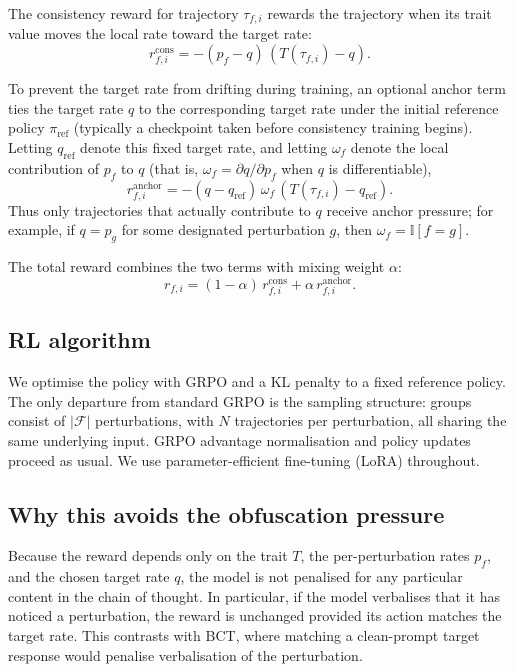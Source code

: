 \documentclass{article}
\begin{document}
The consistency reward for trajectory $\tau_{f,i}$ rewards the
trajectory when its trait value moves the local rate toward the
target rate:
\begin{equation}
r^{\text{cons}}_{f,i} = -(p_f - q)\,(T(\tau_{f,i}) - q).
\end{equation}

To prevent the target rate from drifting during training, an optional anchor term ties the
target rate $q$ to the corresponding target rate under the initial
reference policy $\pi_{\text{ref}}$ (typically a checkpoint taken before consistency
training begins). Letting $q_{\text{ref}}$ denote this fixed target
rate, and letting $\omega_f$ denote the local contribution of $p_f$ to
$q$ (that is, $\omega_f = \partial q / \partial p_f$ when $q$ is
differentiable),
\begin{equation}
r^{\text{anchor}}_{f,i} = -(q - q_{\text{ref}})\,\omega_f\,(T(\tau_{f,i}) - q_{\text{ref}}).
\end{equation}
Thus only trajectories that actually contribute to $q$ receive anchor
pressure; for example, if $q = p_g$ for some designated perturbation
$g$, then $\omega_f = \mathbb{I}[f=g]$.

The total reward combines the two terms with mixing weight $\alpha$:
\begin{equation}
r_{f,i} = (1 - \alpha)\, r^{\text{cons}}_{f,i} + \alpha\, r^{\text{anchor}}_{f,i}.
\end{equation}

\subsection{RL algorithm}
We optimise the policy with GRPO and a KL penalty to a fixed reference
policy. The only departure from standard GRPO is the sampling structure:
groups consist of $|\mathcal{F}|$ perturbations, with $N$ trajectories
per perturbation, all sharing the same underlying input. GRPO
advantage normalisation and policy updates proceed as usual. We use
parameter-efficient fine-tuning (LoRA) throughout.

\subsection{Why this avoids the obfuscation pressure}
Because the reward depends only on the trait $T$, the per-perturbation
rates $p_f$, and the chosen target rate $q$, the model is
not penalised for any particular content in the chain of thought. In
particular, if the model verbalises that it has noticed a perturbation,
the reward is unchanged provided its action matches the target rate.
This contrasts with BCT, where matching a clean-prompt target response
would penalise verbalisation of the perturbation.
\end{document}

